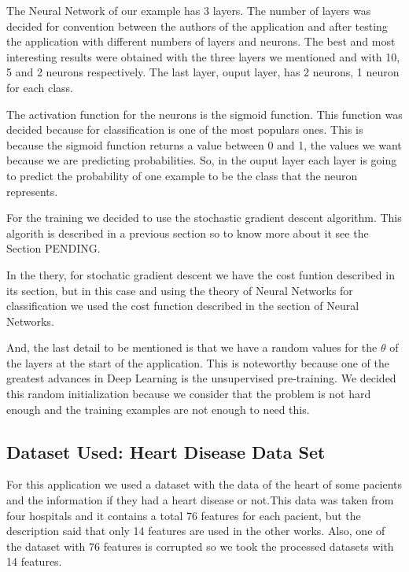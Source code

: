 \documentclass[12pt]{article}
\begin{document}
The Neural Network of our example has 3 layers.  The number of layers was decided for convention between the authors of the application and after testing the application with different numbers of layers and neurons. The best and most interesting results were obtained with the three layers we mentioned and with 10, 5 and 2 neurons respectively. The last layer, ouput layer, has 2 neurons, 1 neuron for each class.

The activation function for the neurons is the sigmoid function. This function was decided because for classification is one of the most populars ones. This is because the sigmoid function returns a value between 0 and 1, the values we want because we are predicting probabilities. So, in the ouput layer each layer is going to predict the probability of one example to be the class that the neuron represents.

For the training we decided to use the stochastic gradient descent algorithm. This algorith is described in a previous section so to know more about it see the Section PENDING.

In the thery, for stochatic gradient descent we have the cost funtion described in its section, but in this case and using the theory of Neural Networks for classification we used the cost function described in the section of Neural Networks.

And, the last detail to be mentioned is that we have a random values for the $\theta$ of the layers at the start of the application. This is noteworthy because one of the greatest advances in Deep Learning is the unsupervised pre-training\cite{erhan2010does,bengio2007greedy}. We decided this random initialization because we consider that the problem is not hard enough and the training examples are not enough to need this.

\subsection{Dataset Used: Heart Disease Data Set \cite{Lichman:2013}}
For this application we used a dataset with the data of the heart of some pacients and the information if they had a heart disease or not.This data was taken from four hospitals and it contains a total 76 features for each pacient, but the description said that only 14 features are used in the other works. Also, one of the dataset with 76 features is corrupted so we took the processed datasets with 14 features. \cite{heartDiseaseC,heartDiseaseZ,heartDiseaseH,heartDiseaseB}
\end{document}
